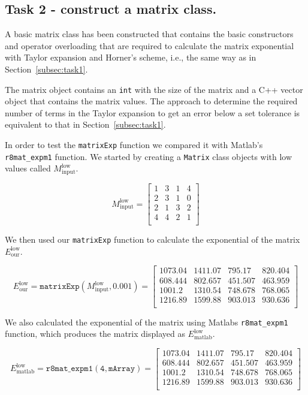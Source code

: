\documentclass[paper=a4, fontsize=11pt]{article} %
\begin{document}
\subsection{Task 2 - construct a matrix class.}

A basic matrix class has been constructed that contains the basic
constructors and operator overloading that are required to calculate
the matrix exponential with Taylor expansion and Horner's scheme,
i.e., the same way as in Section~\ref{subsec:task1}.

The matrix object contains an \texttt{int} with the size of the matrix
and a C++ vector object that contains the matrix values. The approach
to determine the required number of terms in the Taylor expansion to
get an error below a set tolerance is equivalent to that in
Section~\ref{subsec:task1}.

In order to test the \texttt{matrixExp} function we compared it with
Matlab's \texttt{r8mat\_{expm1}} function. We started by creating a
\texttt{Matrix} class objects with low values called $M_{\text{input}}^{\text{low}}$.

\[
  M_{\text{input}}^{\text{low}}=
  \begin{bmatrix}
    1 & 3 & 1 & 4 \\
    2 & 3 & 1 & 0 \\
    2 & 1 & 3 & 2 \\
    4 & 4 & 2 & 1 \\
  \end{bmatrix}
\]

We then used our \texttt{matrixExp} function to calculate the
exponential of the matrix $E_{\text{our}}^{\text{low}}$.

\[
  E_{\text{our}}^{\text{low}} = \mathtt{matrixExp}(M_{\text{input}}^{\text{low}},0.001) =
  \begin{bmatrix}
    1073.04 & 1411.07 & 795.17  & 820.404 \\
    608.444 & 802.657 & 451.507 & 463.959 \\
    1001.2  & 1310.54 & 748.678 & 768.065 \\
    1216.89 & 1599.88 & 903.013 & 930.636 \\
  \end{bmatrix}
\]

We also calculated the exponential of the matrix using Matlabs
\texttt{r8mat\_{expm1}} function, which produces the matrix displayed
as $E_{\text{matlab}}^{\text{low}}$.

\[
  E_{\text{matlab}}^{\text{low}} = \mathtt{r8mat\_{expm1}(4, mArray)} =
  \begin{bmatrix}
    1073.04 & 1411.07 & 795.17  & 820.404 \\
    608.444 & 802.657 & 451.507 & 463.959 \\
    1001.2  & 1310.54 & 748.678 & 768.065 \\
    1216.89 & 1599.88 & 903.013 & 930.636 \\
  \end{bmatrix}
\]
\end{document}
